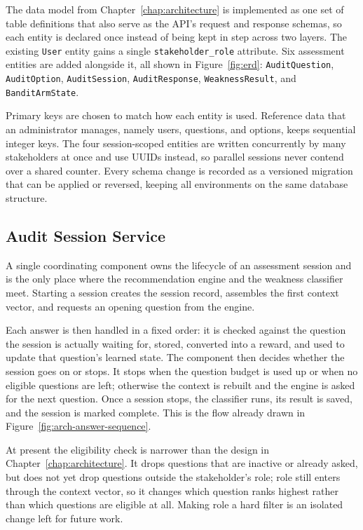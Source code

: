 \documentclass[a4paper, 12pt, oneside, openany, BCOR1cm,toc=chapterentrywithdots]{scrbook}
\begin{document}
The data model from Chapter~\ref{chap:architecture} is implemented as one set of table
definitions that also serve as the API's request and response schemas, so each entity is
declared once instead of being kept in step across two layers. The existing \texttt{User}
entity gains a single \texttt{stakeholder\_role} attribute. Six assessment entities are added
alongside it, all shown in Figure~\ref{fig:erd}: \texttt{AuditQuestion}, \texttt{AuditOption},
\texttt{AuditSession}, \texttt{AuditResponse}, \texttt{WeaknessResult}, and
\texttt{BanditArmState}.

Primary keys are chosen to match how each entity is used. Reference data that an administrator
manages, namely users, questions, and options, keeps sequential integer keys. The four
session-scoped entities are written concurrently by many stakeholders at once and use UUIDs
instead, so parallel sessions never contend over a shared counter. Every schema change is
recorded as a versioned migration that can be applied or reversed, keeping all environments on
the same database structure.

\subsection{Audit Session Service}

A single coordinating component owns the lifecycle of an assessment session and is the only
place where the recommendation engine and the weakness classifier meet. Starting a session
creates the session record, assembles the first context vector, and requests an opening
question from the engine.

Each answer is then handled in a fixed order: it is checked against the question the session is
actually waiting for, stored, converted into a reward, and used to update that question's
learned state. The component then decides whether the session goes on or stops. It stops when
the question budget is used up or when no eligible questions are left; otherwise the context is
rebuilt and the engine is asked for the next question. Once a session stops, the classifier
runs, its result is saved, and the session is marked complete. This is the flow already drawn
in Figure~\ref{fig:arch-answer-sequence}.

At present the eligibility check is narrower than the design in Chapter~\ref{chap:architecture}.
It drops questions that are inactive or already asked, but does not yet drop questions outside
the stakeholder's role; role still enters through the context vector, so it changes which
question ranks highest rather than which questions are eligible at all. Making role a hard
filter is an isolated change left for future work.
\end{document}

